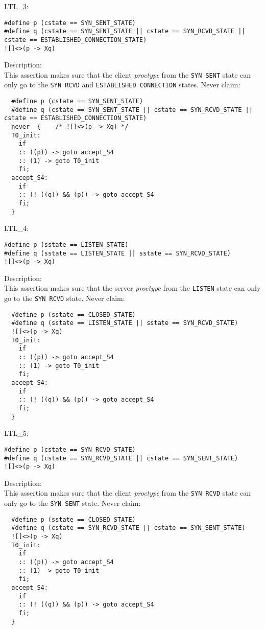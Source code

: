 \documentclass{WigReport}
\begin{document}
LTL\_3:\\
\begin{verbatim}
#define p (cstate == SYN_SENT_STATE)
#define q (cstate == SYN_SENT_STATE || cstate == SYN_RCVD_STATE || cstate == ESTABLISHED_CONNECTION_STATE)
![]<>(p -> Xq)
\end{verbatim}
Description:\\
This assertion makes sure that the client \textit{proctype} from the \verb|SYN SENT| state can only go to the \verb|SYN RCVD| and \verb|ESTABLISHED CONNECTION| states.
Never claim:\\
\begin{verbatim}
  #define p (cstate == SYN_SENT_STATE)
  #define q (cstate == SYN_SENT_STATE || cstate == SYN_RCVD_STATE || cstate == ESTABLISHED_CONNECTION_STATE)
  never  {    /* ![]<>(p -> Xq) */
  T0_init:
    if
    :: ((p)) -> goto accept_S4
    :: (1) -> goto T0_init
    fi;
  accept_S4:
    if
    :: (! ((q)) && (p)) -> goto accept_S4
    fi;
  }
\end{verbatim}


LTL\_4:\\
\begin{verbatim}
#define p (sstate == LISTEN_STATE)
#define q (sstate == LISTEN_STATE || sstate == SYN_RCVD_STATE)
![]<>(p -> Xq)
\end{verbatim}
Description:\\
This assertion makes sure that the server \textit{proctype} from the \verb|LISTEN| state can only go to the \verb|SYN RCVD| state.
Never claim:\\
\begin{verbatim}
  #define p (sstate == CLOSED_STATE)
  #define q (sstate == LISTEN_STATE || sstate == SYN_RCVD_STATE)
  ![]<>(p -> Xq)
  T0_init:
    if
    :: ((p)) -> goto accept_S4
    :: (1) -> goto T0_init
    fi;
  accept_S4:
    if
    :: (! ((q)) && (p)) -> goto accept_S4
    fi;
  }
\end{verbatim}


LTL\_5:\\
\begin{verbatim}
#define p (cstate == SYN_RCVD_STATE)
#define q (cstate == SYN_RCVD_STATE || cstate == SYN_SENT_STATE)
![]<>(p -> Xq)
\end{verbatim}
Description:\\
This assertion makes sure that the client \textit{proctype} from the \verb|SYN RCVD| state can only go to the \verb|SYN SENT| state.
Never claim:\\
\begin{verbatim}
  #define p (sstate == CLOSED_STATE)
  #define q (cstate == SYN_RCVD_STATE || cstate == SYN_SENT_STATE)
  ![]<>(p -> Xq)
  T0_init:
    if
    :: ((p)) -> goto accept_S4
    :: (1) -> goto T0_init
    fi;
  accept_S4:
    if
    :: (! ((q)) && (p)) -> goto accept_S4
    fi;
  }
\end{verbatim}
\end{document}
